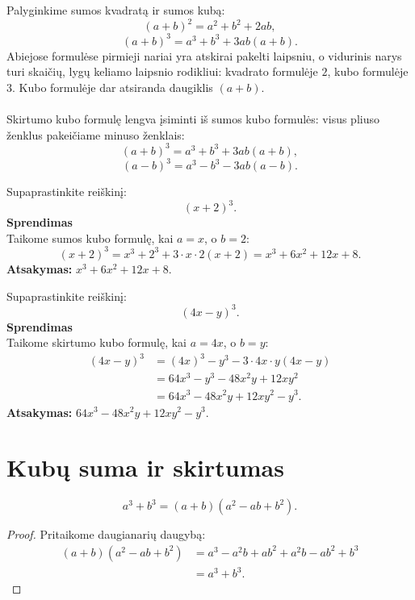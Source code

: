 \documentclass[11pt,a4paper]{scrartcl}
\begin{document}
\begin{remark}
Palyginkime sumos kvadratą ir sumos kubą:
\[
(a+b)^2=a^2+b^2+2ab,
\]
\[
(a+b)^3=a^3+b^3+3ab(a+b).
\]
Abiejose formulėse pirmieji nariai yra atskirai pakelti laipsniu, o vidurinis narys turi skaičių, lygų keliamo laipsnio rodikliui: kvadrato formulėje $2$, kubo formulėje $3$. Kubo formulėje dar atsiranda daugiklis $(a+b)$.\\ \\
Skirtumo kubo formulę lengva įsiminti iš sumos kubo formulės: visus pliuso ženklus pakeičiame minuso ženklais:
\[
(a+b)^3=a^3+b^3+3ab(a+b),
\]
\[
(a-b)^3=a^3-b^3-3ab(a-b).
\]
\end{remark}

\begin{example}
Supaprastinkite reiškinį:
\[
(x+2)^3.
\]
\textbf{Sprendimas}\\
Taikome sumos kubo formulę, kai $a=x$, o $b=2$:
\[
(x+2)^3=x^3+2^3+3\cdot x\cdot2(x+2)=x^3+6x^2+12x+8.
\]
\textbf{Atsakymas:} $x^3+6x^2+12x+8$.
\end{example}

\begin{example}
Supaprastinkite reiškinį:
\[
(4x-y)^3.
\]
\textbf{Sprendimas}\\
Taikome skirtumo kubo formulę, kai $a=4x$, o $b=y$:
\[
\begin{aligned}
(4x-y)^3&=(4x)^3-y^3-3\cdot4x\cdot y(4x-y)\\
&=64x^3-y^3-48x^2y+12xy^2\\
&=64x^3-48x^2y+12xy^2-y^3.
\end{aligned}
\]
\textbf{Atsakymas:} $64x^3-48x^2y+12xy^2-y^3$.
\end{example}

\section{Kubų suma ir skirtumas}

\begin{property}
\[
a^3+b^3=(a+b)(a^2-ab+b^2).
\]
\end{property}

\begin{proof}
Pritaikome daugianarių daugybą:
\[
\begin{aligned}
(a+b)(a^2-ab+b^2)
&=a^3-a^2b+ab^2+a^2b-ab^2+b^3\\
&=a^3+b^3.
\end{aligned}
\]
\end{proof}
\end{document}
